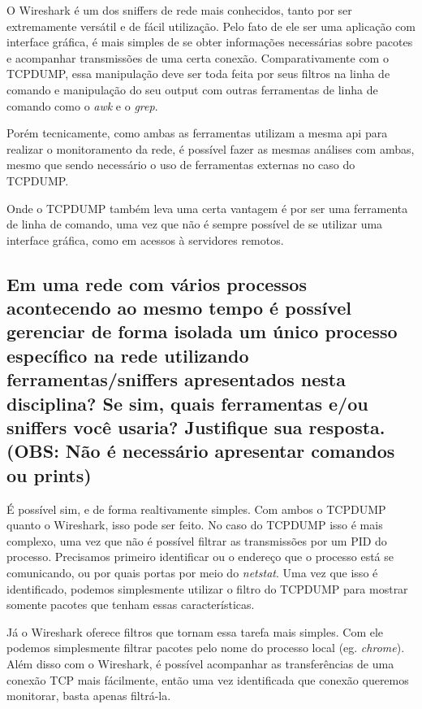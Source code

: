 \documentclass[12pt,a4paper]{report}
\begin{document}
O Wireshark é um dos sniffers de rede mais conhecidos, tanto por ser extremamente versátil e de fácil utilização. Pelo fato de ele ser uma aplicação com interface gráfica, é mais simples de se obter informações necessárias sobre pacotes e acompanhar transmissões de uma certa conexão.
Comparativamente com o TCPDUMP, essa manipulação deve ser toda feita por seus filtros na linha de comando e manipulação do seu output com outras ferramentas de linha de comando como o \emph{awk} e o \emph{grep}.

Porém tecnicamente, como ambas as ferramentas utilizam a mesma api para realizar o monitoramento da rede, é possível fazer as mesmas análises com ambas, mesmo que sendo necessário o uso de ferramentas externas no caso do TCPDUMP.

Onde o TCPDUMP também leva uma certa vantagem é por ser uma ferramenta de linha de comando, uma vez que não é sempre possível de se utilizar uma interface gráfica, como em acessos à servidores remotos.

\subsection{Em uma rede com vários processos acontecendo ao mesmo tempo é possível gerenciar de forma isolada um único processo
        específico na rede utilizando ferramentas/sniffers apresentados nesta disciplina? Se sim, quais ferramentas e/ou sniffers você usaria?
        Justifique sua resposta. (OBS: Não é necessário apresentar comandos ou prints)}

É possível sim, e de forma realtivamente simples. Com ambos o TCPDUMP quanto o Wireshark, isso pode ser feito.
No caso do TCPDUMP isso é mais complexo, uma vez que não é possível filtrar as transmissões por um PID do processo.
Precisamos primeiro identificar ou o endereço que o processo está se comunicando, ou por quais portas por meio do \emph{netstat}.
Uma vez que isso é identificado, podemos simplesmente utilizar o filtro do TCPDUMP para mostrar somente pacotes que tenham essas
características.

Já o Wireshark oferece filtros que tornam essa tarefa mais simples. Com ele podemos simplesmente filtrar pacotes pelo nome do processo local (eg. \emph{chrome}).
Além disso com o Wireshark, é possível acompanhar as transferências de uma conexão TCP mais fácilmente, então uma vez identificada que conexão queremos monitorar, basta apenas filtrá-la.
\end{document}
